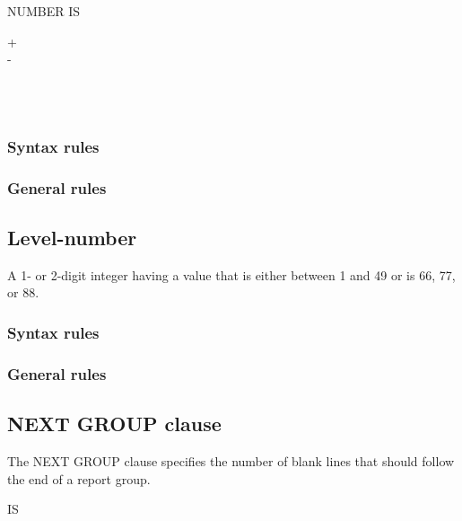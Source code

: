 \begin{syntax}
   NUMBER IS
  \begin{0-1}
    + \\
    - \\
     \\
  \end{0-1}
  \begin{1=}
    \identifier \\
    \integer
  \end{1=}
\end{syntax}

\subsubsection{Syntax rules}

\subsubsection{General rules}

\subsection{Level-number}

A 1- or 2-digit integer having a value that is either between 1 and 49 or is 66, 77,  or 88.

\subsubsection{Syntax rules}

\subsubsection{General rules}

\subsection{NEXT GROUP clause}

The NEXT GROUP clause specifies the number of blank lines that should follow the end of a report group.

\begin{syntax}
    IS
  \begin{1=}
    \begin{0-1}
    \end{0-1}
    \integer \\
     
  \end{1=}
\end{syntax}

